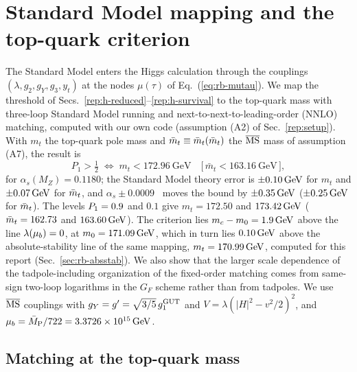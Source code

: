 \section{Standard Model mapping and the top-quark criterion}\label{rep:h-smmap}

The Standard Model enters the Higgs calculation through the couplings $(\lambda,g_2,g_Y,g_3,y_t)$ at the nodes $\mu(\tau)$ of Eq.~(\ref{eq:rb-mutau}).
We map the threshold of Secs.~\ref{rep:h-reduced}--\ref{rep:h-survival} to the top-quark mass with three-loop Standard Model running and next-to-next-to-leading-order (NNLO) matching, computed with our own code (assumption (A2) of Sec.~\ref{rep:setup}).
With $m_t$ the top-quark pole mass and $\bar m_t\equiv\bar m_t(\bar m_t)$ the $\overline{\mathrm{MS}}$ mass of assumption (A7), the result is
\begin{equation}
P_1>\tfrac12 \;\Longleftrightarrow\; m_t<172.96~\mathrm{GeV}
\quad\bigl[\,\bar m_t<163.16~\mathrm{GeV}\,\bigr], %
\label{eq:rb-criterion}
\end{equation}
for $\alpha_s(M_Z)=0.1180$; the Standard Model theory error is $\pm0.10\,\mathrm{GeV}$ for $m_t$ and $\pm0.07\,\mathrm{GeV}$ for $\bar m_t$, and $\alpha_s\pm0.0009$~\cite{ParticleDataGroup:2026mpi} moves the bound by $\pm0.35\,\mathrm{GeV}$ ($\pm0.25\,\mathrm{GeV}$ for $\bar m_t$). %
The levels $P_1=0.9$ and $0.1$ give $m_t=172.50$ and $173.42\,\mathrm{GeV}$ ($\bar m_t=162.73$ and $163.60\,\mathrm{GeV}$). %
The criterion lies $m_c-m_0=1.9\,\mathrm{GeV}$ above the line $\lambda(\mu_b)=0$, at $m_0=171.09\,\mathrm{GeV}$, which in turn lies $0.10\,\mathrm{GeV}$ above the absolute-stability line of the same mapping, $m_t=170.99\,\mathrm{GeV}$, computed for this report (Sec.~\ref{sec:rb-absstab}). %
We also show that the larger scale dependence of the tadpole-including organization of the fixed-order matching comes from same-sign two-loop logarithms in the $G_F$ scheme rather than from tadpoles.
We use $\overline{\mathrm{MS}}$ couplings with $g_Y=g'=\sqrt{3/5}\,g_1^{\rm GUT}$ and $V=\lambda(|H|^2-v^2/2)^2$, and $\mu_b=\bar M_{\mathrm{P}}/722=3.3726\times10^{15}\,\mathrm{GeV}$. %

\subsection{Matching at the top-quark mass}
\label{sec:rb-sm-matching}

